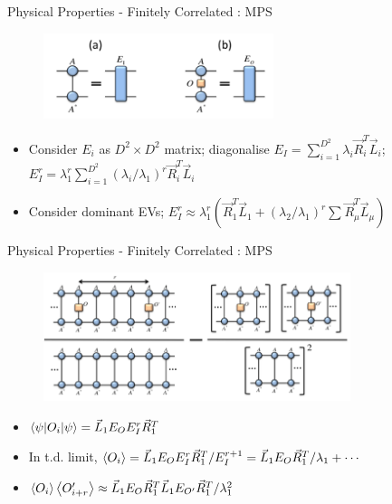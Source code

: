 \documentclass{beamer}
\begin{document}
\begin{frame}{Physical Properties - Finitely Correlated : MPS}
		\begin{figure}[h]
		\includegraphics[width=0.6\textwidth]{fincor}
		\centering
		\end{figure}
	\begin{itemize}
		\item Consider ${ E_{i} }$ as ${ D^2 \times D^2  }$ matrix; diagonalise ${ E_{I} =\sum_{i=1}^{D^2 } \lambda _{i}\vec{R}_{i}^{T}\vec{L}_{i}}$; ${ E_{I}^{r}=\lambda _{1}^{r}\sum_{i=1}^{D^2 } (\lambda _{i}/\lambda _{1})^{r}\vec{R}_{i}^{T}\vec{L}_{i} }$
		\item Consider dominant EVs; ${ E_{I}^{r}\approx \lambda _{1}^{r}\left( \vec{R}_{1}^{T}\vec{L}_{1}+(\lambda _{2}/\lambda _{1})^{r} \sum_{}^{} \vec{R}_{\mu }^{T}\vec{L}_{\mu }\right)  }$
	\end{itemize}
\end{frame}

\begin{frame}{Physical Properties - Finitely Correlated : MPS}
	\begin{figure}[h]
	\includegraphics[width=0.8\textwidth]{corr}
	\centering
	\end{figure}
\begin{itemize}
\item ${ \ev{\psi |O_{i}|\psi }=\vec{L}_{1}E_{O}E_{I}^{r}\vec{R}_{1}^{T}}$\\
\item	In t.d. limit, ${ \ev{O_{i}}=\vec{L}_{1}E_{O}E_{I}^{r}\vec{R}_{1}^{T}/E_{I}^{r+1} =\vec{L}_{1}E_{O}\vec{R}_{1}^{T}/\lambda _{1}+\cdots }$
\item ${ \ev{O_{i}}\ev{O^{\prime}_{i+r}}\approx \vec{L}_{1}E_{O}\vec{R}_{1}^{T}\vec{L}_{1}E_{O^{\prime}} \vec{R}_{1}^{T}/\lambda _{1}^{2} }$

\end{itemize}
\end{frame}
\end{document}
